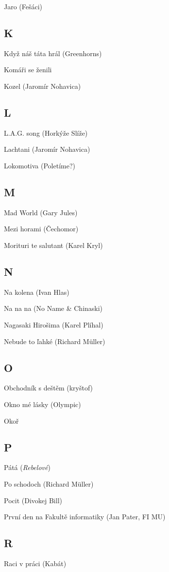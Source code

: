 \begin{multicols}{2}
Jaro (Fešáci)

\subsection*{K}
Když náš táta hrál (Greenhorns)

Komáři se ženili

Kozel (Jaromír Nohavica)

\subsection*{L}
L.A.G. song (Horkýže Slíže)

Lachtani (Jaromír Nohavica)

Lokomotiva (Poletíme?)

\subsection*{M}
Mad World (Gary Jules)

Mezi horami (Čechomor)

Morituri te salutant (Karel Kryl)

\subsection*{N}
Na kolena (Ivan Hlas)

Na na na (No Name \& Chinaski)

Nagasaki Hirošima (Karel Plíhal)

Nebude to ľahké (Richard Müller)

\subsection*{O}
Obchodník s deštěm (kryštof)

Okno mé lásky (Olympic)

Okoř

\subsection*{P}
Pátá (\emph{Rebelové})

Po schodoch (Richard Müller)

Pocit (Divokej Bill)

První den na Fakultě informatiky (Jan Pater, FI MU)

\subsection*{R}
Raci v práci (Kabát)


\end{multicols}
